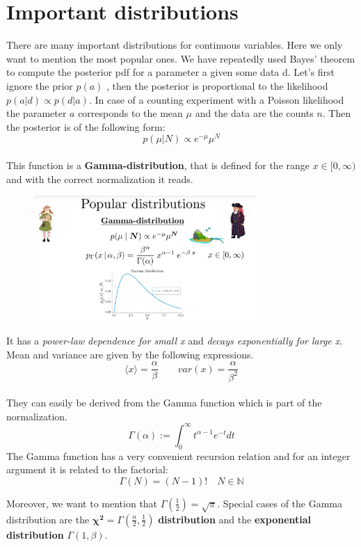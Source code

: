 \documentclass[12pt, a4paper]{scrartcl}
\begin{document}
\section*{Important distributions}
There are many important distributions for continuous variables. Here we
only want to mention the most popular ones.
We have repeatedly used Bayes’ theorem to compute the posterior pdf for a
parameter a given some data d.
Let’s ﬁrst ignore the prior $p(a)$ , then the posterior is proportional to the likelihood $p(a|d)\propto p(d|a)$.
In case of a counting experiment with a Poisson likelihood the parameter
$a$ corresponds to the mean $\mu$ and the data are the counts $n$. Then the
posterior is of the following form:
\begin{equation*}\boxed{p(\mu|N)\propto e^{-\mu}\mu^N
}\end{equation*}\\
This function is a  \textbf{Gamma-distribution}, that is deﬁned for the range $x\in [0,\infty)$
and with the correct normalization it reads.%
 \begin{figure}[H]
	\centering
	\includegraphics[width=0.75\textwidth]{8_11.png}
\end{figure}
It has a \textit{power-law dependence for small x} and \textit{decays exponentially for large
x}. Mean and variance are given by the following expressions.
\begin{equation*}\boxed{\langle x\rangle = \frac{\alpha}{\beta} \qquad var(x)=\frac{\alpha}{\beta^2}
}\end{equation*}\\
They can easily be derived from the Gamma function which is part of
the normalization.
\[\Gamma(\alpha):=\int_0^{\infty}t^{\alpha-1}e^{-t}dt\]
The Gamma function has a very convenient recursion relation
and for an integer argument it is related to the factorial: \[\Gamma(N)=(N-1)! \quad N\in\mathbb{N}\]

Moreover, we want to mention that $\Gamma(\frac 12)=\sqrt{\pi}$.
Special cases of the Gamma distribution are the  $\mathbf{\chi^2}=\Gamma(\frac n2, \frac 12)$ \textbf{distribution} 
and the  \textbf{exponential distribution} $\Gamma(1, \beta)$.\\%
\end{document}
